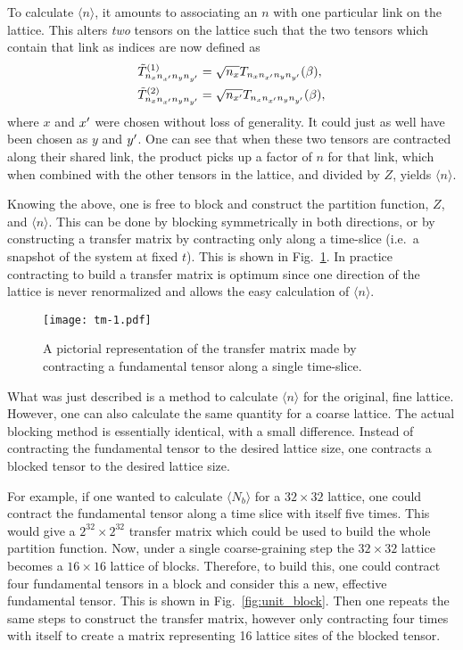 \documentclass[../main.tex]{subfiles}
\begin{document}
To calculate $\langle n \rangle$, it amounts to associating an $n$ with one
particular link on the lattice.
%
This alters \emph{two} tensors on the lattice such that the two tensors which
contain that link as indices are now defined as
%
\begin{align}
	\tilde{T}^{(1)}_{n_{x} n_{{x^{\prime}}} n_{y} n_{{y^{\prime}}}}  &=
    \sqrt{n_{x}} T_{n_{x} n_{{x^{\prime}}} n_{y} n_{{y^{\prime}}}} (\beta),\\
    \tilde{T}^{(2)}_{n_{x} n_{{x^{\prime}}} n_{y} n_{{y^{\prime}}}}  &=
    \sqrt{n_{{x^{\prime}}}}T_{n_{x} n_{{x^{\prime}}} n_{y} n_{{y^{\prime}}}} (\beta),
\end{align}
%
where $x$ and ${x^{\prime}}$ were chosen without loss of generality.
%
It could just as well have been chosen as $y$ and ${y^{\prime}}$.
%
One can see that when these two tensors are contracted along their shared link,
the product picks up a factor of $n$ for that link, which when combined with
the other tensors in the lattice, and divided by $Z$, yields $\langle n
\rangle$.

Knowing the above, one is free to block and construct the partition function,
$Z$, and $\langle n \rangle$.
%
This can be done by blocking symmetrically in both directions, or by
constructing a transfer matrix by contracting only along a time-slice (i.e.\ a
snapshot of the system at fixed $t$).
%
This is shown in Fig.~\ref{fig:tm}.
%
In practice contracting to build a transfer matrix is optimum since one
direction of the lattice is never renormalized and allows the easy calculation
of $\langle n \rangle$.
%
\begin{figure}[htpb]
 \centering
 \texttt{[image: tm-1.pdf]}
 \caption{A pictorial representation of the transfer matrix made by
	 contracting a fundamental tensor along a single time-slice.}%
\label{fig:tm}
\end{figure}
%
%
What was just described is a method to calculate $\langle n \rangle$ for the
original, fine lattice.
%
However, one can also calculate the same quantity for a coarse lattice.
%
The actual blocking method is essentially identical, with a small difference.
%
Instead of contracting the fundamental tensor to the desired lattice size, one
contracts a blocked tensor to the desired lattice size.

For example, if one wanted to calculate $\langle N_{b} \rangle$ for a $32
\times 32$ lattice, one could contract the fundamental tensor along a time
slice with itself five times.
%
This would give a $2^{32} \times 2^{32}$ transfer matrix which could be used to
build the whole partition function.
%
Now, under a single coarse-graining step the $32\times 32$ lattice becomes a
$16\times 16$ lattice of blocks.
%
Therefore, to build this, one could contract four fundamental tensors in a
block and consider this a new, effective fundamental tensor.
%
This is shown in Fig.~\ref{fig:unit_block}.
%
Then one repeats the same steps to construct the transfer matrix, however only
contracting four times with itself to create a matrix representing 16 lattice
sites of the blocked tensor.
\end{document}
